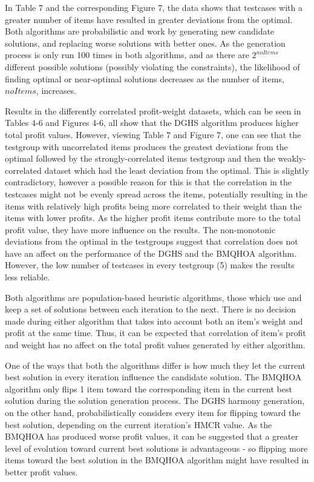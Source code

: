\documentclass[titlepage]{article}
\begin{document}
In Table 7 and the corresponding Figure 7, the data shows that testcases with a greater number of items have resulted in greater deviations from the optimal. Both algorithms are probabilistic and work by generating new candidate solutions, and replacing worse solutions with better ones. As the generation process is only run 100 times in both algorithms, and as there are $2^{noItems}$ different possible solutions (possibly violating the constraints), the likelihood of finding optimal or near-optimal solutions decreases as the number of items, $noItems$, increases.

Results in the differently correlated profit-weight datasets, which can be seen in Tables 4-6 and Figures 4-6, all show that the DGHS algorithm produces higher total profit values. However, viewing Table 7 and Figure 7, one can see that the testgroup with uncorrelated items produces the greatest deviations from the optimal followed by the strongly-correlated items testgroup and then the weakly-correlated dataset which had the least deviation from the optimal. This is slightly contradictory, however a possible reason for this is that the correlation in the testcases might not be evenly spread across the items, potentially resulting in the items with relatively high profits being more correlated to their weight than the items with lower profits. As the higher profit items contribute more to the total profit value, they have more influence on the results. The non-monotonic deviations from the optimal in the testgroups suggest that correlation does not have an affect on the performance of the DGHS and the BMQHOA algorithm. However, the low number of testcases in every testgroup (5) makes the results less reliable.  

Both algorithms are population-based heuristic algorithms, those which use and keep a set of solutions between each iteration to the next. There is no decision made during either algorithm that takes into account both an item's weight and profit at the same time. Thus, it can be expected that correlation of item's profit and weight has no affect on the total profit values generated by either algorithm.  %

One of the ways that both the algorithms differ is how much they let the current best solution in every iteration influence the candidate solution. The BMQHOA algorithm only flips 1 item toward the corresponding item in the current best solution during the solution generation process. The DGHS harmony generation, on the other hand, probabilistically considers every item for flipping toward the best solution, depending on the current iteration's HMCR value.  As the BMQHOA has produced worse profit values, it can be suggested that a greater level of evolution toward current best solutions is advantageous - so flipping more items toward the best solution in the BMQHOA algorithm might have resulted in better profit values.
\end{document}

